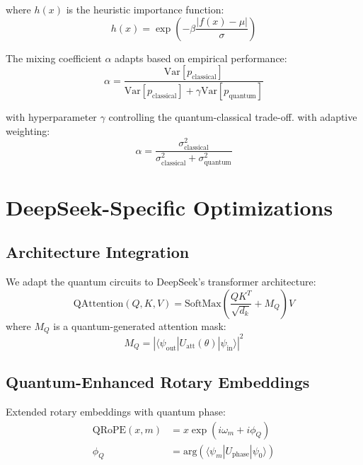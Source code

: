 \documentclass{article}
\begin{document}
where $h(x)$ is the heuristic importance function:
\begin{equation}
h(x) = \exp\left(-\beta \frac{|f(x) - \mu|}{\sigma}\right)
\end{equation}

The mixing coefficient $\alpha$ adapts based on empirical performance:
\begin{equation}
\alpha = \frac{\text{Var}[p_{\text{classical}}]}{\text{Var}[p_{\text{classical}}] + \gamma \text{Var}[p_{\text{quantum}}]}
\end{equation}

with hyperparameter $\gamma$ controlling the quantum-classical trade-off.
with adaptive weighting:
\begin{equation}
\alpha = \frac{\sigma_{\text{classical}}^2}{\sigma_{\text{classical}}^2 + \sigma_{\text{quantum}}^2}
\end{equation}

\section{DeepSeek-Specific Optimizations}

\subsection{Architecture Integration}
We adapt the quantum circuits to DeepSeek's transformer architecture:
\begin{equation}
\text{QAttention}(Q,K,V) = \text{SoftMax}\left(\frac{QK^T}{\sqrt{d_k}} + M_Q\right)V
\end{equation}
where $M_Q$ is a quantum-generated attention mask:
\begin{equation}
M_Q = |\langle\psi_{\text{out}}|U_{\text{att}}(\theta)|\psi_{\text{in}}\rangle|^2
\end{equation}

\subsection{Quantum-Enhanced Rotary Embeddings}
Extended rotary embeddings with quantum phase:
\begin{equation}
\begin{split}
\text{QRoPE}(x,m) &= x\exp(i\omega_m + i\phi_Q) \\
\phi_Q &= \text{arg}(\langle\psi_m|U_{\text{phase}}|\psi_0\rangle)
\end{split}
\end{equation}
\end{document}
